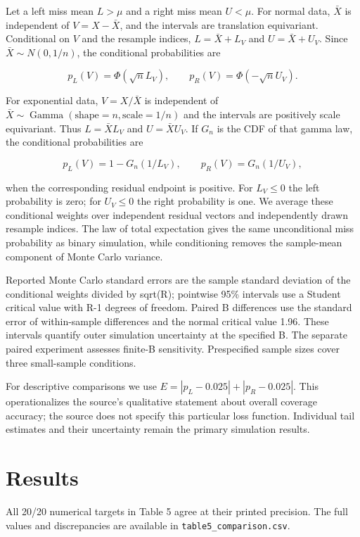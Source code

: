 Let a left miss mean $L>\mu$ and a right miss mean $U<\mu$. For normal data, $\bar X$ is independent of $V=X-\bar X$, and the intervals are translation equivariant. Conditional on $V$ and the resample indices, $L=\bar X+L_V$ and $U=\bar X+U_V$. Since $\bar X\sim N(0,1/n)$, the conditional probabilities are

\[
p_L(V)=\Phi(\sqrt n L_V),\qquad p_R(V)=\Phi(-\sqrt n U_V).
\]

For exponential data, $V=X/\bar X$ is independent of $\bar X\sim\operatorname{Gamma}(\text{shape}=n,\text{scale}=1/n)$ and the intervals are positively scale equivariant. Thus $L=\bar X L_V$ and $U=\bar X U_V$. If $G_n$ is the CDF of that gamma law, the conditional probabilities are

\[
p_L(V)=1-G_n(1/L_V),\qquad p_R(V)=G_n(1/U_V),
\]

when the corresponding residual endpoint is positive. For $L_V\le0$ the left probability is zero; for $U_V\le0$ the right probability is one. We average these conditional weights over independent residual vectors and independently drawn resample indices. The law of total expectation gives the same unconditional miss probability as binary simulation, while conditioning removes the sample-mean component of Monte Carlo variance.

Reported Monte Carlo standard errors are the sample standard deviation of the conditional weights divided by sqrt(R); pointwise 95\% intervals use a Student critical value with R-1 degrees of freedom. Paired B differences use the standard error of within-sample differences and the normal critical value 1.96. These intervals quantify outer simulation uncertainty at the specified B. The separate paired experiment assesses finite-B sensitivity. Prespecified sample sizes cover three small-sample conditions.

For descriptive comparisons we use $E=|p_L-0.025|+|p_R-0.025|$. This operationalizes the source's qualitative statement about overall coverage accuracy; the source does not specify this particular loss function. Individual tail estimates and their uncertainty remain the primary simulation results.

\section{Results}

All 20/20 numerical targets in Table 5 agree at their printed precision. The full values and discrepancies are available in \texttt{table5\_\allowbreak{}comparison.\allowbreak{}csv}.


